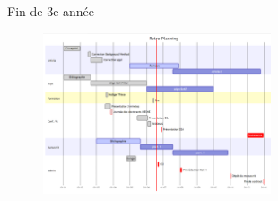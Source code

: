 \documentclass[aspectratio=169]{beamer} %
\begin{document}
\begin{frame}{Fin de 3e année}
    \begin{figure}
        \includegraphics[width=0.6\textwidth]{image/retro_planning.png}
    \end{figure}
\end{frame}



\end{document}
